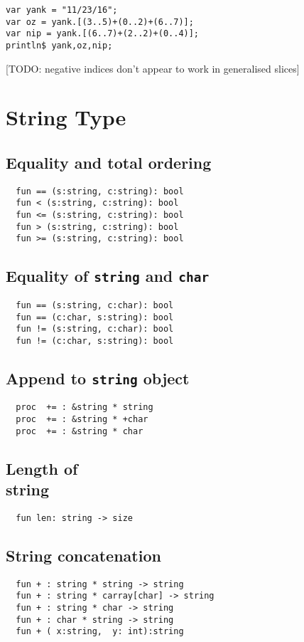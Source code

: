 \documentclass[oneside]{book}
\begin{document}
\begin{verbatim}
var yank = "11/23/16";
var oz = yank.[(3..5)+(0..2)+(6..7)];
var nip = yank.[(6..7)+(2..2)+(0..4)];
println$ yank,oz,nip;
\end{verbatim}

[TODO: negative indices don't appear to work in
generalised slices]


\section{String Type}
\subsection{Equality and total ordering}
\begin{verbatim}
  fun == (s:string, c:string): bool
  fun < (s:string, c:string): bool
  fun <= (s:string, c:string): bool
  fun > (s:string, c:string): bool
  fun >= (s:string, c:string): bool
\end{verbatim}

\subsection{Equality of {\tt string} and {\tt char}}
\begin{verbatim}
  fun == (s:string, c:char): bool
  fun == (c:char, s:string): bool
  fun != (s:string, c:char): bool
  fun != (c:char, s:string): bool
\end{verbatim}

\subsection{Append to {\tt string} object}
\begin{verbatim}
  proc  += : &string * string 
  proc  += : &string * +char
  proc  += : &string * char
\end{verbatim}

\subsection{Length of {\\ string}}
\begin{verbatim}
  fun len: string -> size
\end{verbatim}

\subsection{String concatenation}
\begin{verbatim}
  fun + : string * string -> string
  fun + : string * carray[char] -> string
  fun + : string * char -> string
  fun + : char * string -> string
  fun + ( x:string,  y: int):string
\end{verbatim}
\end{document}
